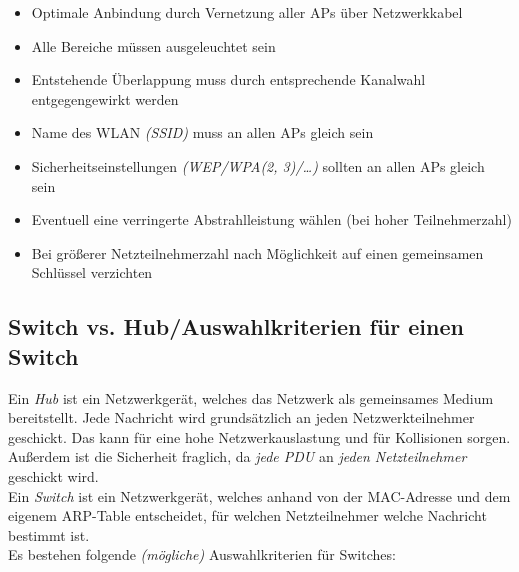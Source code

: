 \documentclass[a4paper, 12pt]{report}
\begin{document}
\begin{multicols}{2}
\begin{itemize}
    \item Optimale Anbindung durch Vernetzung aller APs über Netzwerkkabel
    \item Alle Bereiche müssen ausgeleuchtet sein
    \item Entstehende Überlappung muss durch entsprechende Kanalwahl
	entgegengewirkt werden
    \item Name des WLAN \emph{(SSID)} muss an allen APs gleich sein
    \item Sicherheitseinstellungen \emph{(WEP/WPA(2, 3)/\dots)} sollten an allen
	APs gleich sein
    \item Eventuell eine verringerte Abstrahlleistung wählen (bei hoher
	Teilnehmerzahl)
    \item Bei größerer Netzteilnehmerzahl nach Möglichkeit auf einen gemeinsamen
	Schlüssel verzichten
\end{itemize}

\subsection{Switch vs. Hub/Auswahlkriterien für einen Switch}

Ein \emph{Hub} ist ein Netzwerkgerät, welches das Netzwerk als gemeinsames
Medium bereitstellt. Jede Nachricht wird grundsätzlich an jeden
Netzwerkteilnehmer geschickt. Das kann für eine hohe Netzwerkauslastung und für
Kollisionen sorgen. Außerdem ist die Sicherheit fraglich, da \emph{jede PDU} an
\emph{jeden Netzteilnehmer} geschickt wird. \\

Ein \emph{Switch} ist ein Netzwerkgerät, welches anhand von der MAC-Adresse und
dem eigenem ARP-Table entscheidet, für welchen Netzteilnehmer welche Nachricht
bestimmt ist. \\

Es bestehen folgende \emph{(mögliche)} Auswahlkriterien für Switches:


\end{multicols}
\end{document}
